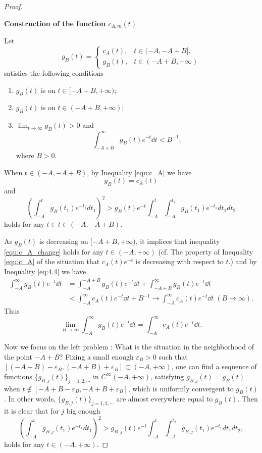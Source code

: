 \begin{proof}
  
  \begin{fancybox}
\begin{center}
  \textbf{Construction of the function $c_{A,m}(t)$}
\end{center}
Let 
\[
  g_B(t)=\begin{cases}
    c_A(t), & t\in (-A,-A+B],\\ 
    g_B(t), & t\in (-A+B,+\infty)
  \end{cases}
\]
satisfies the following conditions 
\begin{enumerate}
  \item $g_B(t)$ is  on $t\in [-A+B,+\infty)$;
  \item $g_B(t)$ is  on $t\in (-A+B,+\infty)$;
  \item $\lim_{t\to\infty} g_B(t)>0$ and 
\begin{equation}
  \label{eq:4.4}
      \int_{-A+B}^{\infty} g_B(t) e^{-t} \dd t<B^{-1},
\end{equation}
  where $B>0$.
\end{enumerate}
  \end{fancybox}
When $t\in (-A,-A+B)$, by Inequality \eqref{equ:c_A} we have 
\[g_B(t)=c_A(t)\]
and 
\begin{equation}
  \label{equ:c_A_change}
  (\int_{-A}^{t}g_{B}(t_{1})e^{-t_{1}}dt_{1})^{2}>g_{B}(t)e^{-t}
  \int_{-A}^{t}\int_{-A}^{t_{2}}g_{B}(t_{1})e^{-t_{1}}dt_{1}dt_{2}
  \end{equation}
holds for any $t\in t\in (-A,-A+B)$.

As $g_B(t)$ is decreasing on $[-A+B,+\infty)$, it implices that inequality \eqref{equ:c_A_change} holds for any $t\in (-A,+\infty)$ (cf. The property of Inequality \eqref{equ:c_A} of the situation that $c_A(t)e^{-t}$ is decreasing with respect to $t$.) and by Inequality \eqref{eq:4.4} we have
\begin{align*}
  \int_{-A}^\infty g_B(t) e^{-t}\dd t &=\int_{-A}^{-A+B} g_B(t) e^{-t}\dd t +\int_{-A+B}^\infty g_B(t) e^{-t}\dd t\\ 
  &<\int_{-A}^\infty c_A(t) e^{-t}\dd t+B^{-1}\rightarrow \int_{-A}^\infty c_A(t) e^{-t}\dd t \;(B\to\infty).
\end{align*}
  Thus 
  \[
    \lim_{B\to\infty} \int_{-A}^\infty g_B(t) e^{-t}\dd t=\int_{-A}^\infty c_A(t) e^{-t}\dd t.
  \]

  Now we focus on the left problem : What is the situation in the neighborhood of the point $-A+B$? Fixing a small enough $\varepsilon_B>0$ such that $[(-A+B)-\varepsilon_B,(-A+B)+\varepsilon_B]\subset (-A,+\infty)$, one can find a sequence of functions
  $\{g_{B,j}(t)\}_{j=1,2,\cdots}$ in $C^{\infty}(-A,+\infty)$,
  satisfying $g_{B,j}(t)=g_{B}(t)$ when
  $t\notin[-A+B-\varepsilon_{B},-A+B+\varepsilon_{B}]$, which is
  uniformly convergent to $g_{B}(t)$. In other words, $\{g_{B,j}(t)\}_{j=1,2,\cdots}$ are almost everywhere equal to $g_B(t)$. Then it is clear that for $j$ big
  enough
  $$(\int_{-A}^{t}g_{B,j}(t_{1})e^{-t_{1}}dt_{1})^{2}
  >g_{B,j}(t)e^{-t}\int_{-A}^{t}
  \int_{-A}^{t_{2}}g_{B,j}(t_{1})e^{-t_{1}}dt_{1}dt_{2},
  $$
  holds for any $t\in(-A,+\infty)$.


\end{proof}
